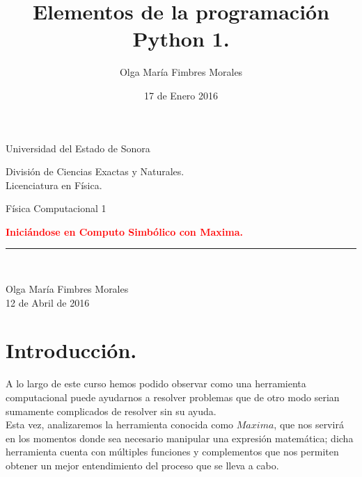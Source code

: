 \documentclass[12pt]{article}
\title{Elementos de la programación Python 1.}
\author{\textcolor{JungleGreen}{Olga María Fimbres Morales}}
\date{17 de Enero 2016}
\begin{document}
\begin{titlepage}

\begin{center}
\begin{large}
Universidad del Estado de Sonora\\
\end{large}
\vspace*{0.15in}
División de Ciencias Exactas y Naturales.\\
\vspace*{0.15in}
Licenciatura en Física. \\
\vspace*{0.6in}
\begin{large}
Física Computacional 1\\
\end{large}
\vspace*{0.2in}
\begin{Large}
\textbf{{\textcolor{Red}{Iniciándose en Computo Simbólico con Maxima.}}} \\
\end{Large}


\rule{80mm}{0.1mm}\\
\vspace*{0.1in}
\begin{large}
{\textcolor{JungleGreen}{Olga María Fimbres Morales}}\\
12 de Abril de 2016\\
\end{large}
\end{center}
\end{titlepage}

\pagebreak
\section*{Introducción.}
  A lo largo de este curso hemos podido observar como una herramienta computacional puede ayudarnos a resolver problemas que de otro modo serian sumamente complicados de resolver sin su ayuda.\\
  
  Esta vez, analizaremos la herramienta conocida como $Maxima$, que nos servirá en los momentos donde sea necesario manipular una expresión matemática; dicha herramienta cuenta con múltiples funciones y complementos que nos permiten obtener un mejor entendimiento del proceso que se lleva a cabo.\\
  
\end{document}

